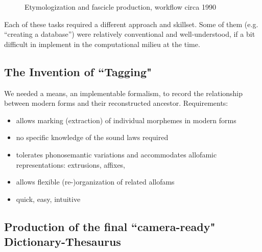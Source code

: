 \begin{figure}[ht]
\centering
{}
\caption{Etymologization and fascicle production, workflow circa 1990}
\label{fig:process1990}
\end{figure}

Each of these tasks required a different approach and skillset. Some
of them (e.g. ``creating a database'') were relatively conventional
and well-understood, if a bit difficult in implement in the
computational milieu at the time.

\subsection{The Invention of ``Tagging"}
We needed a means, an implementable formalism, to record the
relationship between modern forms and their reconstructed ancestor.
Requirements:
\begin{itemize}
\item  allows marking (extraction) of individual morphemes in modern forms
\item  no specific knowledge of the sound laws required
\item  tolerates phonosemantic variations and accommodates allofamic representations: extrusions, affixes, 
\item  allows flexible (re-)organization of related allofams
\item  quick, easy, intuitive
\end{itemize}


\subsection{Production of the final ``camera-ready" Dictionary-Thesaurus}

